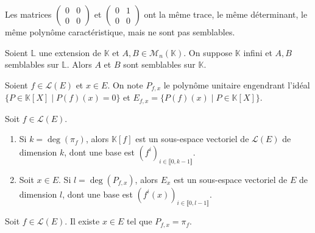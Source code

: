 
  \begin{cexample}
    Les matrices $\begin{pmatrix} 0 & 0 \\ 0 & 0\end{pmatrix}$ et $\begin{pmatrix} 0 & 1 \\ 0 & 0\end{pmatrix}$ ont la même trace, le même déterminant, le même polynôme caractéristique, mais ne sont pas semblables.
  \end{cexample}


  \begin{theorem}
    Soient $\mathbb{L}$ une extension de $\mathbb{K}$ et $A, B \in \mathcal{M}_n(\mathbb{K})$. On suppose $\mathbb{K}$ infini et $A, B$  semblables sur $\mathbb{L}$. Alors $A$ et $B$ sont semblables sur $\mathbb{K}$.
  \end{theorem}


  \begin{notation}
    Soient $f \in \mathcal{L}(E)$ et $x \in E$. On note $P_{f,x}$ le polynôme unitaire engendrant l'idéal $\{ P \in \mathbb{K}[X] \mid P(f)(x) = 0 \}$ et $E_{f,x} = \{ P(f)(x) \mid P \in \mathbb{K}[X] \}$.
  \end{notation}

  \begin{lemma}
    Soit $f \in \mathcal{L}(E)$.
    \begin{enumerate}[label={\bfseries(\roman*)}]
      \item Si $k = \deg(\pi_f)$, alors $\mathbb{K}[f]$ est un sous-espace vectoriel de $\mathcal{L}(E)$ de dimension $k$, dont une base est $(f^i)_{i \in \llbracket 0, k-1 \rrbracket}$.
      \item Soit $x \in E$. Si $l = \deg(P_{f,x})$, alors $E_x$ est un sous-espace vectoriel de $E$ de dimension $l$, dont une base est $(f^i(x))_{i \in \llbracket 0, l-1 \rrbracket}$.
    \end{enumerate}
  \end{lemma}

  \begin{lemma}
    Soit $f \in \mathcal{L}(E)$. Il existe $x \in E$ tel que $P_{f,x} = \pi_f$.
  \end{lemma}

